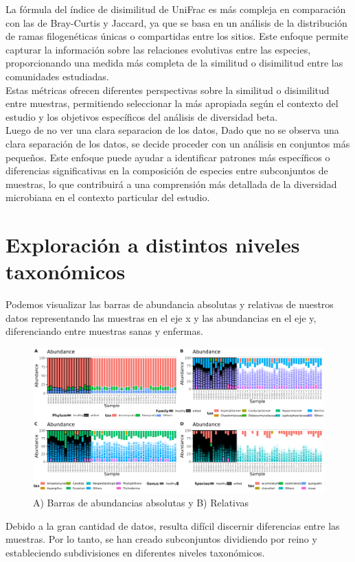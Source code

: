 La fórmula del índice de disimilitud de UniFrac es más compleja en comparación con las de Bray-Curtis y Jaccard, ya que se basa en un análisis de la distribución de ramas filogenéticas únicas o compartidas entre los sitios. Este enfoque permite capturar la información sobre las relaciones evolutivas entre las especies, proporcionando una medida más completa de la similitud o disimilitud entre las comunidades estudiadas. \\

Estas métricas ofrecen diferentes perspectivas sobre la similitud o disimilitud entre muestras, permitiendo seleccionar la más apropiada según el contexto del estudio y los objetivos específicos del análisis de diversidad beta.\\

Luego de no ver una clara separacion de los datos, Dado que no se observa una clara separación de los datos, se decide proceder con un análisis en conjuntos más pequeños. Este enfoque puede ayudar a identificar patrones más específicos o diferencias significativas en la composición de especies entre subconjuntos de muestras, lo que contribuirá a una comprensión más detallada de la diversidad microbiana en el contexto particular del estudio.\\

\section{Exploración a distintos niveles taxonómicos}
Podemos visualizar las barras de abundancia absolutas y relativas de nuestros datos representando las muestras en el eje x y las abundancias en el eje y, diferenciando entre muestras sanas y enfermas.\\
\begin{figure}[h]
\centering
\includegraphics[width=\textwidth]{Img/cap2/Barras_Eukarya10.png}
\caption{A) Barras de abundancias absolutas y B) Relativas}
\end{figure}
Debido a la gran cantidad de datos, resulta difícil discernir diferencias entre las muestras. Por lo tanto, se han creado subconjuntos dividiendo por reino y estableciendo subdivisiones en diferentes niveles taxonómicos.\\

